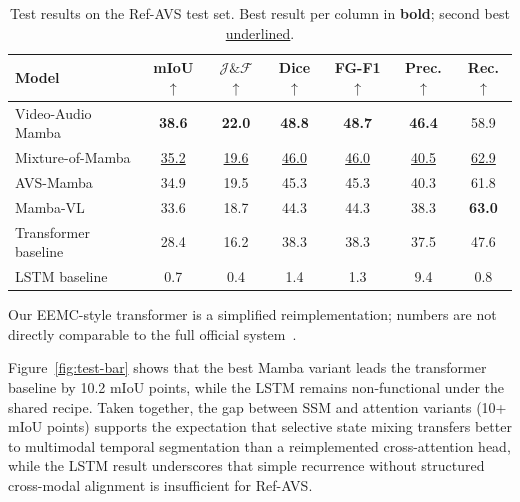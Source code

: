 \documentclass[a4paper,12pt]{extarticle}
\begin{document}
\begin{table}[t]
\centering
\caption{Test results on the Ref-AVS test set. Best result per column in \textbf{bold}; second best \underline{underlined}.}
\label{tab:main-results}
\small
\begin{threeparttable}
\begin{tabular}{lcccccc}
\toprule
Model & mIoU$\uparrow$ & $\mathcal{J}\&\mathcal{F}$$\uparrow$ & Dice$\uparrow$ & FG-F1$\uparrow$ & Prec.$\uparrow$ & Rec.$\uparrow$ \\
\midrule
Video-Audio Mamba & \textbf{38.6} & \textbf{22.0} & \textbf{48.8} & \textbf{48.7} & \textbf{46.4} & 58.9 \\
Mixture-of-Mamba & \underline{35.2} & \underline{19.6} & \underline{46.0} & \underline{46.0} & \underline{40.5} & \underline{62.9} \\
AVS-Mamba & 34.9 & 19.5 & 45.3 & 45.3 & 40.3 & 61.8 \\
Mamba-VL & 33.6 & 18.7 & 44.3 & 44.3 & 38.3 & \textbf{63.0} \\
Transformer baseline & 28.4 & 16.2 & 38.3 & 38.3 & 37.5 & 47.6 \\
LSTM baseline & 0.7 & 0.4 & 1.4 & 1.3 & 9.4 & 0.8 \\
\bottomrule
\end{tabular}
\begin{tablenotes}
\small
\item Our EEMC-style transformer is a simplified reimplementation; numbers are not directly comparable to the full official system~\cite{wang2024refavs}.
\end{tablenotes}
\end{threeparttable}
\end{table}

Figure~\ref{fig:test-bar} shows that the best Mamba variant leads the transformer baseline by 10.2 mIoU points, while the LSTM remains non-functional under the shared recipe. Taken together, the gap between SSM and attention variants (10+ mIoU points) supports the expectation that selective state mixing transfers better to multimodal temporal segmentation than a reimplemented cross-attention head, while the LSTM result underscores that simple recurrence without structured cross-modal alignment is insufficient for Ref-AVS.
\end{document}
